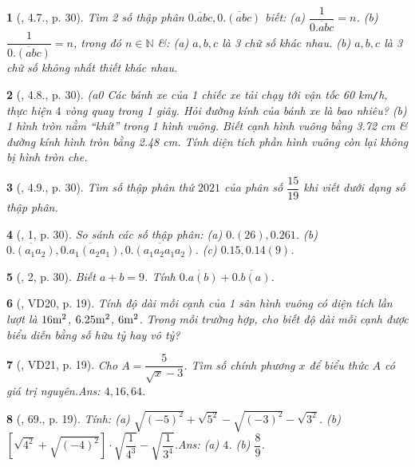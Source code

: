 \documentclass{article}
\newtheorem{baitoan}{}
\begin{document}
\begin{baitoan}[\cite{Binh_boi_duong_Toan_7_tap_1}, 4.7., p. 30]
	Tìm 2 số thập phân $\overline{0.abc},\overline{0.(abc)}$ biết: (a) $\dfrac{1}{\overline{0.abc}} = n$. (b) $\dfrac{1}{\overline{0.(abc)}} = n$, trong đó $n\in\mathbb{N}$ \&: (a) $a,b,c$ là 3 chữ số khác nhau. (b) $a,b,c$ là 3 chữ số không nhất thiết khác nhau.
\end{baitoan}

\begin{baitoan}[\cite{Binh_boi_duong_Toan_7_tap_1}, 4.8., p. 30]
	(a0 Các bánh xe của 1 chiếc xe tải chạy tới vận tốc {\rm60 km{\tt/}h}, thực hiện $4$ vòng quay trong 1 giây. Hỏi đường kính của bánh xe là bao nhiêu? (b) 1 hình tròn nằm ``khít'' trong 1 hình vuông. Biết cạnh hình vuông bằng {\rm3.72 cm} \& đường kính hình tròn bằng {\rm2.48 cm}. Tính diện tích phần hình vuông còn lại không bị hình tròn che.
\end{baitoan}

\begin{baitoan}[\cite{Binh_boi_duong_Toan_7_tap_1}, 4.9., p. 30]
	Tìm số thập phân thứ $2021$ của phân số $\dfrac{15}{19}$ khi viết dưới dạng số thập phân.
\end{baitoan}

\begin{baitoan}[\cite{Binh_boi_duong_Toan_7_tap_1}, 1, p. 30]
	So sánh các số thập phân: (a) $0.(26),0.261$. (b) $\overline{0.(a_1a_2)},\overline{0.a_1(a_2a_1)},\overline{0.(a_1a_2a_1a_2)}$. (c) $0.15,0.14(9)$.
\end{baitoan}

\begin{baitoan}[\cite{Binh_boi_duong_Toan_7_tap_1}, 2, p. 30]
	Biết $a + b = 9$. Tính $\overline{0.a(b)} + \overline{0.b(a)}$.
\end{baitoan}

\begin{baitoan}[\cite{Tuyen_Toan_7}, VD20, p. 19]
	Tính độ dài mỗi cạnh của 1 sân hình vuông có diện tích lần lượt là $\rm16m^2$, $\rm6.25m^2$, $\rm6m^2$. Trong mỗi trường hợp, cho biết độ dài mỗi cạnh được biểu diễn bằng số hữu tỷ hay vô tỷ?
\end{baitoan}

\begin{baitoan}[\cite{Tuyen_Toan_7}, VD21, p. 19]
	Cho $A = \dfrac{5}{\sqrt{x} - 3}$. Tìm số chính phương $x$ để biểu thức $A$ có giá trị nguyên.\hfill{\sf Ans:} $4,16,64$.
\end{baitoan}

\begin{baitoan}[\cite{Tuyen_Toan_7}, 69., p. 19]
	Tính: (a) $\sqrt{(-5)^2} + \sqrt{5^2} - \sqrt{(-3)^2} - \sqrt{3^2}$. (b) $\left[\sqrt{4^2} + \sqrt{(-4)^2}\right]\cdot\sqrt{\dfrac{1}{4^3}} - \sqrt{\dfrac{1}{3^4}}$.\hfill{\sf Ans:} (a) $4$. (b) $\dfrac{8}{9}$.
\end{baitoan}
\end{document}
